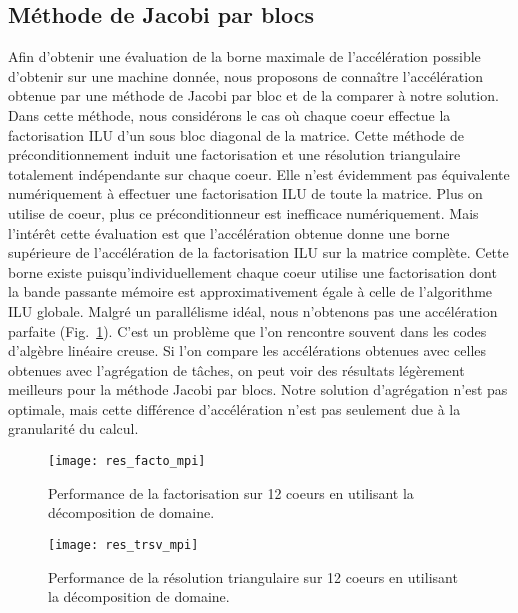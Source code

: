 \subsection{Méthode de Jacobi par blocs}
Afin d'obtenir une évaluation de la borne maximale de l'accélération possible d'obtenir sur une machine donnée, nous proposons de connaître l'accélération obtenue par une méthode de Jacobi par bloc et de la comparer à notre solution.
%
Dans cette méthode, nous considérons le cas où chaque coeur effectue la factorisation ILU d'un sous bloc diagonal de la matrice.
%
Cette méthode de préconditionnement induit une factorisation et une résolution triangulaire totalement indépendante sur chaque coeur.
%
Elle n'est évidemment pas équivalente numériquement à effectuer une factorisation ILU de toute la matrice.
%
Plus on utilise de coeur, plus ce préconditionneur est inefficace numériquement\cite{domain_decomp}.
%
Mais l'intérêt cette évaluation est que l'accélération obtenue donne une borne supérieure de l'accélération de la factorisation ILU sur la matrice complète.
%
Cette borne existe puisqu’individuellement chaque coeur utilise une factorisation dont la bande passante mémoire est approximativement égale à celle de l'algorithme ILU globale.
%
Malgré un parallélisme idéal, nous n'obtenons pas une accélération parfaite (Fig.~\ref{fig:res_facto_mpi}).
%
C'est un problème que l'on rencontre souvent dans les codes d'algèbre linéaire creuse.
%
Si l'on compare les accélérations obtenues avec celles obtenues avec l'agrégation de tâches, on peut voir des résultats légèrement meilleurs pour la méthode Jacobi par blocs.
%
Notre solution d'agrégation n'est pas optimale, mais cette différence d'accélération n'est pas seulement due à la granularité du calcul.

\begin{figure}
  \centering
  \texttt{[image: res\_facto\_mpi]}
  \caption{Performance de la factorisation sur 12 coeurs en utilisant la décomposition de domaine.}
  \label{fig:res_facto_mpi}
\end{figure}
\begin{figure}
  \centering
  \texttt{[image: res\_trsv\_mpi]}
  \caption{Performance de la résolution triangulaire sur 12 coeurs en utilisant la décomposition de domaine.}
  \label{fig:res_trsv_mpi}
\end{figure}

